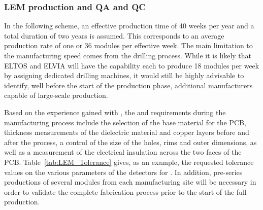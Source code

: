 \subsubsection{LEM production and QA and QC}
\label{sec:fddp-crp-LEMprod}

In the following scheme, an effective production time of \num{40} weeks per year and a total duration of two years is assumed. This corresponds to an average  production rate of one  or \num{36}  modules per effective week. The main limitation to the manufacturing speed comes from the  drilling process. While it is likely that ELTOS and ELVIA will have the capability each to produce \num{18}   modules per week by assigning dedicated drilling machines, it would still be highly advisable to identify, well before the start of the  production phase, additional manufacturers capable of large-scale production. 

Based on the experience gained with  , the   and  requirements during the  manufacturing process include the selection of the base material for the  PCB, thickness measurements of the dielectric material and copper layers before and after the process, a control of the size of the  holes, rims and outer dimensions, as 
well as a measurement of the electrical insulation across the two faces of the PCB.  
Table~\ref{tab:LEM_Tolerance} gives, as an example, the requested tolerance values on the various parameters of the  detectors for  . In addition, pre-series productions of several  modules from each manufacturing site will be necessary in order to validate the complete fabrication process prior to the start of the full production.

